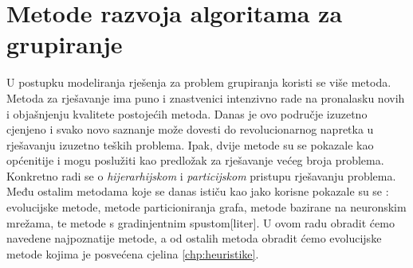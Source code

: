 \documentclass[a4paper,twoside,12pt]{memoir} %
\begin{document}
\section[Metode razvoja algoritama za grupiranje][metode razvoja]{Metode razvoja algoritama za grupiranje}
U postupku modeliranja rješenja za problem grupiranja koristi se više metoda. Metoda za rješavanje ima puno i znastvenici intenzivno rade na pronalasku novih i objašnjenju kvalitete postojećih metoda. Danas je ovo područje izuzetno cjenjeno i svako novo saznanje može dovesti do revolucionarnog napretka u rješavanju izuzetno teških problema. Ipak, dvije metode su se pokazale kao općenitije i mogu poslužiti kao predložak za rješavanje većeg broja problema. Konkretno radi se o \textit{hijerarhijskom} i \textit{particijskom} pristupu rješavanju problema. Među ostalim metodama koje se danas ističu kao jako korisne pokazale su se : evolucijske metode, metode particioniranja grafa, metode bazirane na neuronskim mrežama, te metode s gradinjentnim spustom[liter]. U ovom radu obradit ćemo navedene najpoznatije metode, a od ostalih metoda obradit ćemo evolucijske metode kojima je posvećena cjelina \ref{chp:heuristike}.
\end{document}

